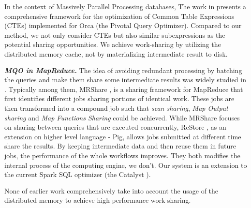 In the context of Massively Parallel Processing databases, The work in \cite{el2015optimization} presents a comprehensive framework for the optimization of Common Table Expressions (CTEs) implemented for Orca (the Pivotal Query Optimizer). Compared to our method, we not only consider CTEs but also similar subexpressions as the potential sharing opportunities. We achieve work-sharing by utilizing the distributed memory cache, not by materializing intermediate result to disk.

\emph{\textbf{MQO in MapReduce.}} The idea of avoiding redundant processing by batching the queries and make them share some intermediate results was widely studied in \cite{mrshare, mqo, agrawal2008scheduling, bhatotia2011incoop, elghandour2012restore, silva2012exploiting, li2011platform, li2012scalla}. Typically among them, MRShare \cite{mrshare}, is a sharing framework for MapReduce that first identifies different jobs sharing portions of identical work. These jobs are then transformed into a compound job such that \emph{scan sharing}, \emph{Map Output sharing} and \emph{Map Functions Sharing} could be achieved. While MRShare focuses on sharing between queries that are executed concurrently, ReStore \cite{elghandour2012restore}, as an extension on higher level language - Pig, allows jobs submitted at different time share the results. By keeping intermediate data and then reuse them in future jobs, the performance of the whole workflows improves. They both modifies the internal process of the computing engine, we don't. Our system is an extension to the current Spark SQL optimizer (the Catalyst \cite{sparksql}).

None of earlier work comprehensively take into account the usage of the distributed memory to achieve high performance work sharing.


